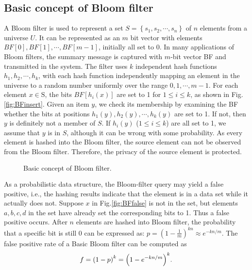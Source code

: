 \documentclass[10pt,journal,letterpaper]{IEEEtran}
\newcommand{\rev}[1]{\uwave{#1}}
\begin{document}
\subsection{Basic concept of Bloom filter}
\label{subsec:Basic concept of Bloom filter}
A Bloom filter is used to represent a set $S = \left\{ {{s_1},{s_2}, \cdots ,{s_n}} \right\}$ of $n$ elements from a universe $U$. It can be represented as an $m$ bit vector with elements $BF[0],BF[1], \cdots ,BF\left[ {m - 1} \right]$, initially all set to 0.
In many applications of Bloom filters, the summary message is captured with $m$-bit vector BF and transmitted in the system.
The filter uses $k$ independent hash functions $h_1,h_2, \cdots ,h_k$, with each hash function independently mapping an element in the universe to a random number uniformly over the range ${0,1, \cdots ,m-1}$. For each element ${x} \in {\text{S}}$, the bits $BF[h_i(x)]$ are set to 1 for $1 \le i \le k$, as shown in Fig.\ref{fig:BFinsert}. Given an item $y$, we check its membership by examining the BF whether the bits at positions $h_1(y),h_2(y), \cdots ,h_k(y)$ are set to 1.  If not, then $y$ is definitely not a member of $S$.  If $h_i(y)$ ($1 \le i \le k$) are all set to 1, we assume that $y$ is in $S$, although it can be wrong with some probability. %
As every element is hashed into the Bloom filter, the source element can not be observed from the Bloom filter. Therefore, the privacy of the source element is protected.
\begin{figure}[!h]
\centering
{}
\caption{Basic concept of Bloom filter.}
\label{fig:Operations on basic bloom filter}
\end{figure}

As a probabilistic data structure, the Bloom-filter query may yield a false positive, i.e., the hashing results indicate that the element is in a data set while it actually does not. Suppose $x$ in Fig.\ref{fig:BFfalse} is not in the set, but elements $a, b, c, d$ in the set have already set the corresponding bits to 1. Thus a false positive occurs. After $n$ elements are hashed into Bloom filter, the probability that a specific bit is still 0 can be expressed as: $p = {\left( {1 - \frac{1}{m}} \right)^{kn}} \approx {e^{ - kn/m}}$. The false positive rate of a Basic Bloom filter can be computed as
\begin{equation}
\footnotesize
f = {\left( {1 - p} \right)^k} = {\left( {1 - {e^{ - kn/m}}} \right)^k}.
\label{eq:false positive}
\end{equation}
\end{document}

